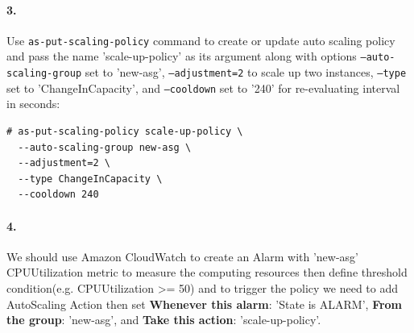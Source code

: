 \documentclass[a4paper]{article}
\begin{document}
\paragraph{3. } Use \texttt{as-put-scaling-policy} command to create or update auto scaling policy and pass the name 'scale-up-policy' as its argument along with options \texttt{--auto-scaling-group} set to 'new-asg', \texttt{--adjustment=2} to scale up two instances, \texttt{--type} set to 'ChangeInCapacity', and \texttt{--cooldown} set to '240' for re-evaluating interval in seconds:

\begin{verbatim}
# as-put-scaling-policy scale-up-policy \
  --auto-scaling-group new-asg \
  --adjustment=2 \
  --type ChangeInCapacity \
  --cooldown 240
\end{verbatim}

\paragraph{4. } We should use Amazon CloudWatch to create an Alarm with 'new-asg' CPUUtilization metric to measure the computing resources then define threshold condition(e.g. CPUUtilization \textgreater= 50) and to trigger the policy we need to add AutoScaling Action then set \textbf{Whenever this alarm}: 'State is ALARM', \textbf{From the group}: 'new-asg', and \textbf{Take this action}: 'scale-up-policy'.

\end{document}
